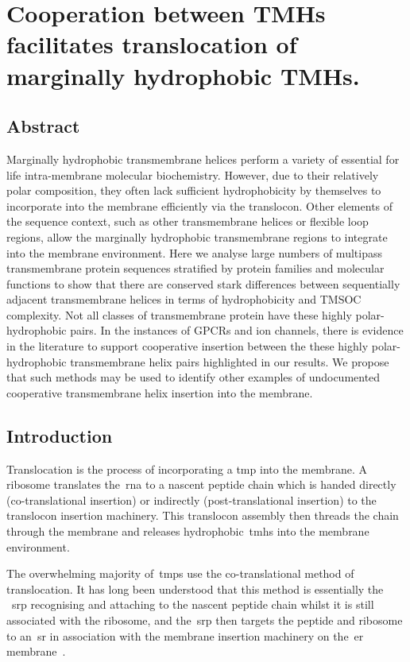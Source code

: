 \chapter{Cooperation between TMHs facilitates translocation of marginally hydrophobic TMHs.}
\section{Abstract}

Marginally hydrophobic transmembrane helices perform a variety of essential for life intra-membrane molecular biochemistry.
However, due to their relatively polar composition, they often lack sufficient hydrophobicity by themselves to incorporate into the membrane efficiently via the translocon.
Other elements of the sequence context, such as other transmembrane helices or flexible loop regions, allow the marginally hydrophobic transmembrane regions to integrate into the membrane environment.
Here we analyse large numbers of multipass transmembrane protein sequences stratified by protein families and molecular functions to show that there are conserved stark differences between sequentially adjacent transmembrane helices in terms of hydrophobicity and TMSOC complexity.
Not all classes of transmembrane protein have these highly polar\--hydrophobic pairs.
In the instances of GPCRs and ion channels, there is evidence in the literature to support cooperative insertion between the these highly polar\--hydrophobic transmembrane helix pairs highlighted in our results.
We propose that such methods may be used to identify other examples of undocumented cooperative transmembrane helix insertion into the membrane.

\section{Introduction}

Translocation is the process of incorporating a \gls{tmp} into the membrane.
A ribosome translates the~\gls{rna} to a nascent peptide chain which is handed directly (co-translational insertion) or indirectly (post\--translational insertion) to the translocon insertion machinery.
This translocon assembly then threads the chain through the membrane and releases hydrophobic~\gls{tmh}s into the membrane environment.

The overwhelming majority of~\gls{tmp}s use the co-translational method of translocation.
It has long been understood that this method is essentially the ~\gls{srp} recognising and attaching to the nascent peptide chain whilst it is still associated with the ribosome, and the~\gls{srp} then targets the peptide and ribosome to an~\gls{sr} in association with the membrane insertion machinery on the~\gls{er} membrane~\cite{Pool2005, Hessa2005}.

